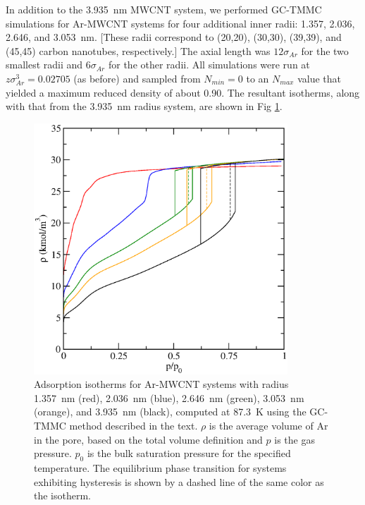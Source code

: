 In addition to the 3.935~nm MWCNT system, we performed GC-TMMC simulations for Ar-MWCNT systems for four additional inner radii: 1.357, 2.036, 2.646, and 3.053~nm. [These radii correspond to (20,20), (30,30), (39,39), and (45,45) carbon nanotubes\cite{Frey_Tubegen_2011}, respectively.] The axial length was $12\sigma_{Ar}$ for the two smallest radii and $6\sigma_{Ar}$ for the other radii. All simulations were run at $z\sigma_{Ar}^3=0.02705$ (as before) and sampled from $N_{min}=0$ to an $N_{max}$ value that yielded a maximum reduced density of about 0.90. The resultant isotherms, along with that from the 3.935~nm radius system, are shown in Fig \ref{cs1043_grouped_isotherm}.
%
\begin{figure}
 \includegraphics[clip=true,width=0.85\textwidth]{Figures/grouped_isotherm_1043}
  \caption{Adsorption isotherms for Ar-MWCNT systems with radius 1.357~nm (red), 2.036~nm (blue), 2.646~nm (green), 3.053~nm (orange), and 3.935~nm (black), computed at 87.3~K using the GC-TMMC method described in the text. $\rho$ is the average volume of Ar in the pore, based on the total volume definition and $p$ is the gas pressure. $p_0$ is the bulk saturation pressure for the specified temperature. The equilibrium phase transition for systems exhibiting hysteresis is shown by a dashed line of the same color as the isotherm.}
  \label{cs1043_grouped_isotherm}
\end{figure}
%
